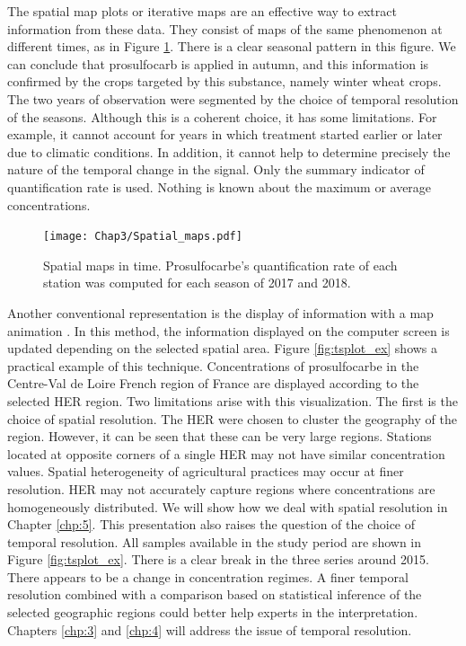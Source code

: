 The spatial map plots or iterative maps \cite{Andrienko2003} are an effective way to extract information from these data. They consist of maps of the same phenomenon at different times, as in Figure \ref{fig:spa_ex}. There is a clear seasonal pattern in this figure. We can conclude that prosulfocarb is applied in autumn, and this information is confirmed by the crops targeted by this substance, namely winter wheat crops. The two years of observation were segmented by the choice of temporal resolution of the seasons. Although this is a coherent choice, it has some limitations. For example, it cannot account for years in which treatment started earlier or later due to climatic conditions. In addition, it cannot help to determine precisely the nature of the temporal change in the signal. Only the summary indicator of quantification rate is used. Nothing is known about the maximum or average concentrations.
 
\begin{figure}[ht]
    \centering
    \texttt{[image: Chap3/Spatial\_maps.pdf]}
    \caption{Spatial maps in time. Prosulfocarbe's quantification rate of each station was computed for each season of 2017 and 2018.}
    \label{fig:spa_ex}
\end{figure}

Another conventional representation is the display of information with a map animation \cite{Andrienko2003}. In this method, the information displayed on the computer screen is updated depending on the selected spatial area. Figure \ref{fig:tsplot_ex} shows a practical example of this technique. Concentrations of prosulfocarbe in the Centre-Val de Loire French region of France are displayed according to the selected HER region. Two limitations arise with this visualization. The first is the choice of spatial resolution. The HER were chosen to cluster the geography of the region. However, it can be seen that these can be very large regions. Stations located at opposite corners of a single HER may not have similar concentration values. Spatial heterogeneity of agricultural practices may occur at finer resolution. HER may not accurately capture regions where concentrations are homogeneously distributed. We will show how we deal with spatial resolution in Chapter \ref{chp:5}. This presentation also raises the question of the choice of temporal resolution. All samples available in the study period are shown in Figure \ref{fig:tsplot_ex}. There is a clear break in the three series around 2015. There appears to be a change in concentration regimes. A finer temporal resolution combined with a comparison based on statistical inference of the selected geographic regions could better help experts in the interpretation. Chapters \ref{chp:3} and \ref{chp:4} will address the issue of temporal resolution.


